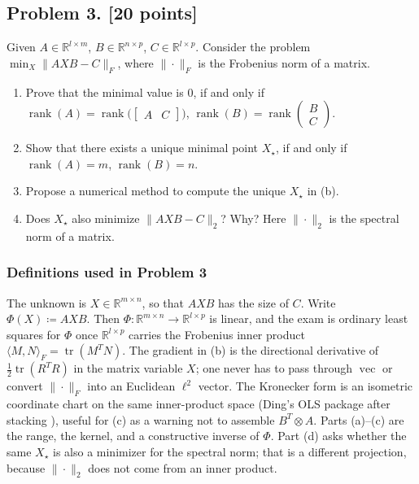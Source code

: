 \documentclass[11pt,a4paper]{article}
\DeclareMathOperator{\rank}{rank}
\begin{document}
\subsection{Problem 3. [20 points]}
Given \(A \in \mathbb{R}^{l \times m}\), \(B \in \mathbb{R}^{n \times p}\), \(C \in \mathbb{R}^{l \times p}\). Consider the problem \(\min_{X}\|AXB - C\|_{F}\), where \(\|\cdot\|_{F}\) is the Frobenius norm of a matrix.
\begin{enumerate}[label=(\alph*)]
    \item Prove that the minimal value is \(0\), if and only if \(\rank(A) = \rank\bigl(\begin{bmatrix} A & C \end{bmatrix}\bigr)\), \(\rank(B) = \rank\begin{pmatrix} B \\ C \end{pmatrix}\).
    \item Show that there exists a unique minimal point \(X_{\star}\), if and only if \(\rank(A) = m\), \(\rank(B) = n\).
    \item Propose a numerical method to compute the unique \(X_{\star}\) in (b).
    \item Does \(X_{\star}\) also minimize \(\|AXB - C\|_{2}\)? Why? Here \(\|\cdot\|_{2}\) is the spectral norm of a matrix.
\end{enumerate}

\setcounter{section}{3}

\subsubsection{Definitions used in Problem 3}

The unknown is \(X\in\mathbb{R}^{m\times n}\), so that \(AXB\) has the size of \(C\). Write \(\Phi(X)\coloneqq AXB\). Then \(\Phi:\mathbb{R}^{m\times n}\to\mathbb{R}^{l\times p}\) is linear, and the exam is ordinary least squares for \(\Phi\) once \(\mathbb{R}^{l\times p}\) carries the Frobenius inner product \(\langle M,N\rangle_{F}=\operatorname{tr}(M^{T}N)\). The gradient in (b) is the directional derivative of \(\tfrac12\operatorname{tr}(R^{T}R)\) in the matrix variable \(X\); one never has to pass through \(\operatorname{vec}\) or convert \(\|\cdot\|_{F}\) into an Euclidean \(\ell^{2}\) vector. The Kronecker form is an isometric coordinate chart on the same inner-product space (Ding's OLS package after stacking \cite{ding24}), useful for (c) as a warning not to assemble \(B^{T}\otimes A\). Parts (a)--(c) are the range, the kernel, and a constructive inverse of \(\Phi\). Part (d) asks whether the same \(X_{\star}\) is also a minimizer for the spectral norm; that is a different projection, because \(\|\cdot\|_{2}\) does not come from an inner product.
\end{document}
